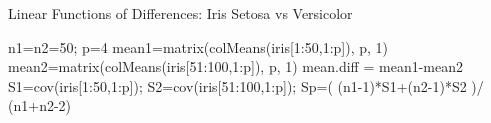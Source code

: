 \documentclass[
  ignorenonframetext,
]{beamer}
\newenvironment{Shaded}{\begin{snugshade}}{\end{snugshade}}
\newcommand{\DecValTok}[1]{\textcolor[rgb]{0.00,0.00,0.81}{#1}}
\newcommand{\FunctionTok}[1]{\textcolor[rgb]{0.00,0.00,0.00}{#1}}
\newcommand{\NormalTok}[1]{#1}
\newcommand{\OtherTok}[1]{\textcolor[rgb]{0.56,0.35,0.01}{#1}}
\newcommand{\SpecialCharTok}[1]{\textcolor[rgb]{0.00,0.00,0.00}{#1}}
\begin{document}
\begin{frame}[fragile]{Linear Functions of Differences: Iris Setosa vs
Versicolor}
\protect\hypertarget{linear-functions-of-differences-iris-setosa-vs-versicolor-1}{}
\begin{Shaded}
\begin{Highlighting}[]
\NormalTok{n1}\OtherTok{=}\NormalTok{n2}\OtherTok{=}\DecValTok{50}\NormalTok{; p}\OtherTok{=}\DecValTok{4}
\NormalTok{mean1}\OtherTok{=}\FunctionTok{matrix}\NormalTok{(}\FunctionTok{colMeans}\NormalTok{(iris[}\DecValTok{1}\SpecialCharTok{:}\DecValTok{50}\NormalTok{,}\DecValTok{1}\SpecialCharTok{:}\NormalTok{p]), p, }\DecValTok{1}\NormalTok{)}
\NormalTok{mean2}\OtherTok{=}\FunctionTok{matrix}\NormalTok{(}\FunctionTok{colMeans}\NormalTok{(iris[}\DecValTok{51}\SpecialCharTok{:}\DecValTok{100}\NormalTok{,}\DecValTok{1}\SpecialCharTok{:}\NormalTok{p]), p, }\DecValTok{1}\NormalTok{)}
\NormalTok{mean.diff }\OtherTok{=}\NormalTok{ mean1}\SpecialCharTok{{-}}\NormalTok{mean2}
\NormalTok{S1}\OtherTok{=}\FunctionTok{cov}\NormalTok{(iris[}\DecValTok{1}\SpecialCharTok{:}\DecValTok{50}\NormalTok{,}\DecValTok{1}\SpecialCharTok{:}\NormalTok{p]); S2}\OtherTok{=}\FunctionTok{cov}\NormalTok{(iris[}\DecValTok{51}\SpecialCharTok{:}\DecValTok{100}\NormalTok{,}\DecValTok{1}\SpecialCharTok{:}\NormalTok{p]); }
\NormalTok{Sp}\OtherTok{=}\NormalTok{( (n1}\DecValTok{{-}1}\NormalTok{)}\SpecialCharTok{*}\NormalTok{S1}\SpecialCharTok{+}\NormalTok{(n2}\DecValTok{{-}1}\NormalTok{)}\SpecialCharTok{*}\NormalTok{S2 )}\SpecialCharTok{/}\NormalTok{ (n1}\SpecialCharTok{+}\NormalTok{n2}\DecValTok{{-}2}\NormalTok{)}
\end{Highlighting}
\end{Shaded}
\end{frame}
\end{document}
